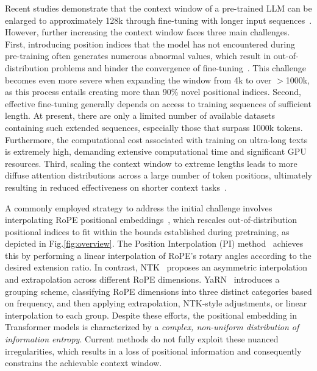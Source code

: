 Recent studies demonstrate that the context window of a pre-trained LLM can be enlarged to approximately 128k through fine-tuning with longer input sequences~\cite{longlora,pi,yarn,zhang2024soaring,liu2023scaling}. However, further increasing the context window faces three main challenges. First, introducing position indices that the model has not encountered during pre-training often generates numerous abnormal values, which result in out-of-distribution problems and hinder the convergence of fine-tuning~\cite{pi}. This challenge becomes even more severe when expanding the window from 4k to over $>$1000k, as this process entails creating more than 90\% novel positional indices. Second, effective fine-tuning generally depends on access to training sequences of sufficient length. At present, there are only a limited number of available datasets containing such extended sequences, especially those that surpass 1000k tokens. Furthermore, the computational cost associated with training on ultra-long texts is extremely high, demanding extensive computational time and significant GPU resources. Third, scaling the context window to extreme lengths leads to more diffuse attention distributions across a large number of token positions, ultimately resulting in reduced effectiveness on shorter context tasks~\cite{pi}.

A commonly employed strategy to address the initial challenge involves interpolating RoPE positional embeddings~\cite{rope,pi}, which rescales out-of-distribution positional indices to fit within the bounds established during pretraining, as depicted in Fig.\ref{fig:overview}. The Position Interpolation (PI) method~\cite{pi} achieves this by performing a linear interpolation of RoPE’s rotary angles according to the desired extension ratio. In contrast, NTK~\cite{ntk,dynamicntk} proposes an asymmetric interpolation and extrapolation across different RoPE dimensions. YaRN~\cite{yarn} introduces a grouping scheme, classifying RoPE dimensions into three distinct categories based on frequency, and then applying extrapolation, NTK-style adjustments, or linear interpolation to each group. Despite these efforts, the positional embedding in Transformer models is characterized by a \emph{complex, non-uniform distribution of information entropy}. Current methods do not fully exploit these nuanced irregularities, which results in a loss of positional information and consequently constrains the achievable context window.

